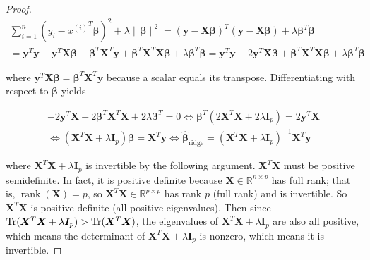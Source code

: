 \begin{proof}

\begin{multline*}
 \sum_{i=1}^{n}\left(y_{i}-{x^{(i)}}^T\boldsymbol{\beta} \right )^{2}+\lambda\lVert \boldsymbol{\beta}\rVert ^{2} = (\boldsymbol{y} - \boldsymbol{X}\boldsymbol{\beta})^T(\boldsymbol{y}-\boldsymbol{X}\boldsymbol{\beta}) + \lambda \boldsymbol{\beta}^T\boldsymbol{\beta}
\\ = \boldsymbol{y}^T\boldsymbol{y} - \boldsymbol{y}^T\boldsymbol{X}\boldsymbol{\beta} - \boldsymbol{\beta}^T\boldsymbol{X}^T\boldsymbol{y}+\boldsymbol{\beta}^T\boldsymbol{X}^T\boldsymbol{X}\boldsymbol{\beta} + \lambda \boldsymbol{\beta}^T\boldsymbol{\beta} = \boldsymbol{y}^T\boldsymbol{y} - 2\boldsymbol{y}^T\boldsymbol{X}\boldsymbol{\beta} +\boldsymbol{\beta}^T\boldsymbol{X}^T\boldsymbol{X}\boldsymbol{\beta} + \lambda \boldsymbol{\beta}^T\boldsymbol{\beta}
\end{multline*}

where \(\boldsymbol{y}^T\boldsymbol{X}\boldsymbol{\beta} =\boldsymbol{\beta}^T\boldsymbol{X}^T\boldsymbol{y}\) because a scalar equals its transpose. Differentiating with respect to \(\boldsymbol{\beta}\) yields

\begin{multline*}
-2\boldsymbol{y}^T\boldsymbol{X} + 2\boldsymbol{\beta}^T \boldsymbol{X}^T\boldsymbol{X} + 2\lambda \boldsymbol{\beta}^T = 0 \iff \boldsymbol{\beta}^T(2\boldsymbol{X}^T\boldsymbol{X} + 2\lambda \boldsymbol{I}_p) = 2 \boldsymbol{y}^T\boldsymbol{X}
\\ \iff (\boldsymbol{X}^T\boldsymbol{X} + \lambda \boldsymbol{I}_p) \boldsymbol{\beta}=  \boldsymbol{X}^T\boldsymbol{y} \iff \hat{\boldsymbol{\beta}}_{\text{ridge}} = (\boldsymbol{X}^T\boldsymbol{X} + \lambda \boldsymbol{I}_p)^{-1}\boldsymbol{X}^T\boldsymbol{y}
 \end{multline*}
 
 where \(\boldsymbol{X}^T\boldsymbol{X} + \lambda \boldsymbol{I}_p\) is invertible by the following argument. \(\boldsymbol{X}^T\boldsymbol{X}\) must be positive semidefinite. In fact, it is positive definite because \( \boldsymbol{X} \in \mathbb{R}^{n \times p}\) has full rank; that is, \(\operatorname{rank}(\boldsymbol{X}) = p\), so \(\boldsymbol{X}^T\boldsymbol{X} \in \mathbb{R}^{p \times p}\) has rank \(p\) (full rank) and is invertible. So \(\boldsymbol{X}^T\boldsymbol{X}\) is positive definite (all positive eigenvalues). Then since \(\operatorname{Tr}(\boldsymbol{X}^T\boldsymbol{X} + \lambda \boldsymbol{I}_p) > \operatorname{Tr}(\boldsymbol{X}^T\boldsymbol{X})\), the eigenvalues of \(\boldsymbol{X}^T\boldsymbol{X} + \lambda \boldsymbol{I}_p\) are also all positive, which means the determinant of \(\boldsymbol{X}^T\boldsymbol{X} + \lambda \boldsymbol{I}_p\) is nonzero, which means it is invertible.

\end{proof}

